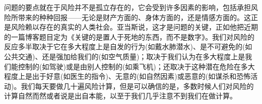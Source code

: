 \documentclass[cs4size, a4paper,12pt]{article}
\begin{document}
问题的要点就在于风险并不是孤立存在的，它会受到许多因素的影响，包括承担风险所带来的种种回报——无论是财产方面的、身体方面的，还是情感方面的。这正是风险赖以存在的真实的人类社会。亚当斯说，这才是问题的关键，正如他把近期的一篇博客题目定为《关键的是置人于死地的东西，而不是数字》。我们对风险的反应多半取决于它在多大程度上是自发的行为(如戴水肺潜水)、是不可避免的(如公共交通)、还是强加给我们的(如空气质量)；取决于我们认为在多大程度上是我们能控制的(如驾驶)或是由别人控制的(如乘飞机)；还取决于这种潜在危险在多大程度上是出于好意(如医生的指令)、无意的(如自然因素)或恶意的(如谋杀和恐怖活动)。我们每天要做几十遍风险计算，但是可以确信的是，多数时候人们对风险的计算自然而然或者说是出自本能，以至于我们几乎注意不到我们在做计算。
\end{document}
